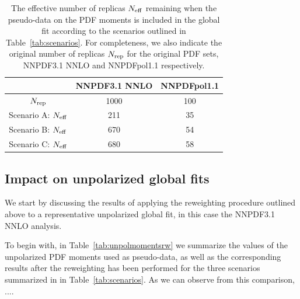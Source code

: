 \begin{table}[t]
  \centering
  \begin{tabular}{c|c|c}
    \hline
    &  NNPDF3.1 NNLO  &  NNPDFpol1.1 \\
    \hline
    \hline
    $N_{\rm rep}$   &   1000 &  100   \\
    \hline
    Scenario A: $N_{\rm eff}$    &   211  &  35   \\
    Scenario B: $N_{\rm eff}$    &   670   &   54  \\
    Scenario C: $N_{\rm eff}$    &   680  &   58  \\
    \hline
  \end{tabular}
  \caption{\small The effective number of replicas
    $N_{\rm eff}$ remaining when the pseudo-data
    on the PDF moments is included in the global
    fit according to the scenarios outlined
    in Table~\ref{tab:scenarios}.
    For completeness, we also indicate the original number
    of replicas $N_{\rm rep}$ for the original
    PDF sets, NNPDF3.1 NNLO and NNPDFpol1.1 respectively.
    \label{tab:neff}
  }
\end{table}

\subsection{Impact on unpolarized global fits}
%
We start by discussing the results of applying the reweighting procedure
outlined above to a representative unpolarized
global fit, in this case the NNPDF3.1 NNLO analysis.

To begin with, in Table~\ref{tab:unpolmomentsrw} we summarize
the values of the unpolarized PDF moments
  used as pseudo-data, as well as the corresponding results
  after the reweighting has been performed for the
three scenarios summarized in 
in Table~\ref{tab:scenarios}.
%
As we can observe from this comparison, ....

